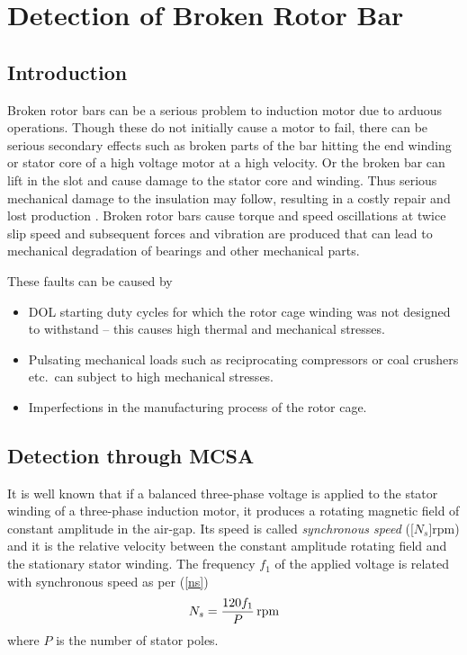 \documentclass[a4paper,11pt]{report}
\begin{document}

\chapter{Detection of Broken Rotor Bar}
\section{Introduction}
Broken rotor bars can be a serious problem to induction motor due to arduous operations. Though these do not initially cause a motor to fail, there can be serious secondary effects such as broken parts of the bar hitting the end winding or stator core of a high voltage motor at a high velocity. Or the broken bar can lift in the slot and cause damage to the stator core and winding. Thus serious mechanical damage to the insulation may follow, resulting in a costly repair and lost production \cite{t32pg145}. Broken rotor bars cause torque and speed oscillations at twice slip speed and subsequent forces and vibration are produced that can lead to mechanical degradation of bearings and other mechanical parts.

These faults can be caused by
\begin{itemize}
\item DOL starting duty cycles for which the rotor cage winding was not designed to withstand -- this causes high thermal and mechanical stresses. 
\item Pulsating mechanical loads such as reciprocating compressors or coal crushers etc.~can subject to high mechanical stresses.
\item Imperfections in the manufacturing process of the rotor cage.
\end{itemize}

\section{Detection through MCSA}
It is well known that if a balanced three-phase voltage is applied to the stator winding of a three-phase induction motor, it produces a rotating magnetic field of constant amplitude in the air-gap. Its speed is called \emph{synchronous speed} (\unit[$N_{s}$]{rpm}) and it is the relative velocity between the constant amplitude rotating field and the stationary stator winding. The frequency $f_{1}$ of the applied voltage is related with synchronous speed as per (\ref{ns})
\begin{equation}
N_{s} = \unit[\frac{120f_{1}}{P}]{rpm} \label{ns}
\end{equation}
where $P$ is the number of stator poles.
\end{document}

